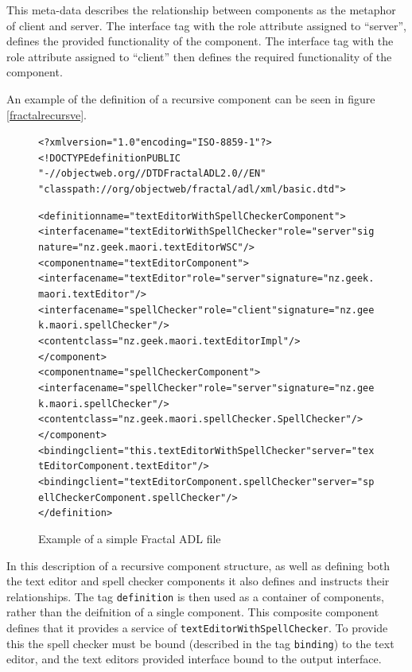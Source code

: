 This meta-data describes the relationship between components as the metaphor of client and server.
The interface tag with the role attribute assigned to ``server'', defines the provided functionality of the component.
The interface tag with the role attribute assigned to ``client'' then defines the required functionality of the component.  

An example of the definition of a recursive component can be seen in figure \ref{fractalrecursve}.

\begin{figure}[htp]
\begin{center}
\begin{alltt}
<?xml version="1.0" encoding="ISO-8859-1" ?>
<!DOCTYPE definition PUBLIC 
    "-//objectweb.org//DTD Fractal ADL 2.0//EN" 
    "classpath://org/objectweb/fractal/adl/xml/basic.dtd">

<definition name="textEditorWithSpellCheckerComponent">
  <interface name="textEditorWithSpellChecker" role="server" signature="nz.geek.maori.textEditorWSC"/>
  <component name="textEditorComponent">
    <interface name="textEditor" role="server" signature="nz.geek.maori.textEditor"/>
    <interface name="spellChecker" role="client" signature="nz.geek.maori.spellChecker"/>
    <content class="nz.geek.maori.textEditorImpl"/>
  </component>
  <component name="spellCheckerComponent">
    <interface name="spellChecker" role="server" signature="nz.geek.maori.spellChecker"/>
    <content class="nz.geek.maori.spellChecker.SpellChecker"/>
  </component>
  <binding client="this.textEditorWithSpellChecker" server="textEditorComponent.textEditor"/>
  <binding client="textEditorComponent.spellChecker" server="spellCheckerComponent.spellChecker"/>
</definition>
\end{alltt}
  \caption[Fractal ADL Example]{Example of a simple Fractal ADL file}
  \label{fractalmetadata}
\end{center}
\end{figure}

In this description of a recursive component structure, as well as defining both the text editor and spell checker components it also defines and instructs their relationships.
The tag \verb+definition+ is then used as a container of components, rather than the deifnition of a single component.
This composite component defines that it provides a service of \verb+textEditorWithSpellChecker+.
To provide this the spell checker must be bound (described in the tag \verb+binding+) to the text editor,
and the text editors provided interface bound to the output interface. 

